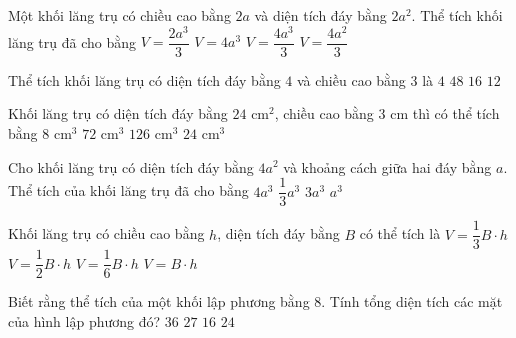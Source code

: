 \begin{ex}%
	Một khối lăng trụ có chiều cao bằng $2a$ và diện tích đáy bằng $2a^2$. Thể tích khối lăng trụ đã cho bằng
	\choice
	{ $V=\dfrac{2a^3}{3}$}
	{ \True$V=4a^3$}
	{ $V=\dfrac{4a^3}{3}$}
	{ $V=\dfrac{4a^2}{3}$}
\end{ex}

\begin{ex}%
	Thể tích khối lăng trụ có diện tích đáy bằng $4$ và chiều cao bằng $3$ là
	\choice
	{ $4$}
	{ $48$}
	{ $16$}
	{ \True$12$}
\end{ex}

\begin{ex}%
	Khối lăng trụ có diện tích đáy bằng $24$ $\mathrm{cm}^2$, chiều cao bằng $3$ $\mathrm{cm}$ thì có thể tích bằng
	\choice
	{ $8$ $\mathrm{cm}^3$}
	{ \True $72$ $\mathrm{cm}^3$}
	{ $126$ $\mathrm{cm}^3$}
	{ $24$ $\mathrm{cm}^3$}
\end{ex}

\begin{ex}%
	Cho khối lăng trụ có diện tích đáy bằng $4a^2$ và khoảng cách giữa hai đáy bằng $a$. Thể tích của khối lăng trụ đã cho bằng
	\choice
	{ \True $4a^3$}
	{ $\dfrac{1}{3}{a^3}$}
	{ $3a^3$}
	{ $a^3$}
\end{ex}

\begin{ex}%
	Khối lăng trụ có chiều cao bằng $h$, diện tích đáy bằng $B$ có thể tích là
	\choice
	{ $V=\dfrac{1}{3}B\cdot h$}
	{ $V=\dfrac{1}{2}B\cdot h$}
	{ $V=\dfrac{1}{6}B\cdot h$}
	{ \True $V=B\cdot h$}
\end{ex}

\begin{ex}%
	Biết rằng thể tích của một khối lập phương bằng $8$. Tính tổng diện tích các mặt của hình lập phương đó?
	\choice
	{ $36$}
	{ $27$}
	{ $16$}
	{ \True $24$}
\end{ex}

